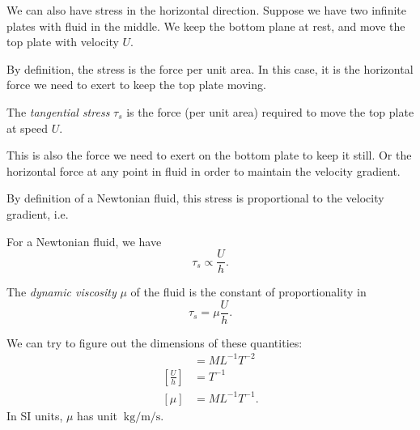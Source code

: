 \documentclass[a4paper]{article}
\begin{document}
We can also have stress in the horizontal direction. Suppose we have two infinite plates with fluid in the middle. We keep the bottom plane at rest, and move the top plate with velocity $U$.
\begin{center}
\end{center}
By definition, the stress is the force per unit area. In this case, it is the horizontal force we need to exert to keep the top plate moving.

\begin{defi}
  The \emph{tangential stress} $\tau_s$ is the force (per unit area) required to move the top plate at speed $U$.
\end{defi}
This is also the force we need to exert on the bottom plate to keep it still. Or the horizontal force at any point in fluid in order to maintain the velocity gradient.

By definition of a Newtonian fluid, this stress is proportional to the velocity gradient, i.e.
\begin{law}
  For a Newtonian fluid, we have
  \[
    \tau_s \propto \frac{U}{h}.
  \]
\end{law}

\begin{defi}
  The \emph{dynamic viscosity} $\mu$ of the fluid is the constant of proportionality in
  \[
    \tau_s = \mu \frac{U}{h}.
  \]
\end{defi}

We can try to figure out the dimensions of these quantities:
\begin{align*}
  [\tau_s] &= ML^{-1} T^{-2}\\
  \left[\frac{U}{h}\right] &= T^{-1}\\
  [\mu] &= ML^{-1} T^{-1}.
\end{align*}
In SI units, $\mu$ has unit $\SI{}{\kilo\gram\per\meter\per\second}$.
\end{document}
